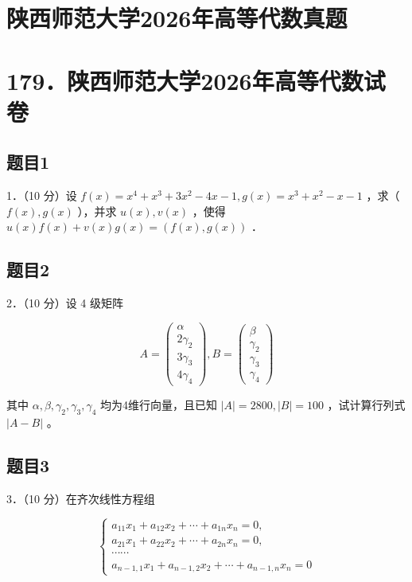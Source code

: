 \documentclass{article}
\begin{document}
\section*{陕西师范大学2026年高等代数真题}
\section*{179．陕西师范大学2026年高等代数试卷}

\subsection{题目1}
1．（10 分）设 \(f(x)=x^{4}+x^{3}+3 x^{2}-4 x-1, g(x)=x^{3}+x^{2}-x-1\) ，求（ \(f(x), g(x)\) ），并求 \(u(x), v(x)\) ，使得 \(u(x) f(x)+v(x) g(x)=(f(x), g(x))\) ．

\subsection{题目2}
2．（10 分）设 4 级矩阵

\[
A=\left(\begin{array}{c}
\alpha \\
2 \gamma_{2} \\
3 \gamma_{3} \\
4 \gamma_{4}
\end{array}\right), B=\left(\begin{array}{c}
\beta \\
\gamma_{2} \\
\gamma_{3} \\
\gamma_{4}
\end{array}\right)
\]

其中 \(\alpha, \beta, \gamma_{2}, \gamma_{3}, \gamma_{4}\) 均为4维行向量，且已知 \(|A|=2800,|B|=100\) ，试计算行列式 \(|A-B|\) 。

\subsection{题目3}
3．（10 分）在齐次线性方程组

\[
\left\{\begin{array}{c}
a_{11} x_{1}+a_{12} x_{2}+\cdots+a_{1 n} x_{n}=0, \\
a_{21} x_{1}+a_{22} x_{2}+\cdots+a_{2 n} x_{n}=0, \\
\cdots \cdots \\
a_{n-1,1} x_{1}+a_{n-1,2} x_{2}+\cdots+a_{n-1, n} x_{n}=0
\end{array}\right.
\]
\end{document}

